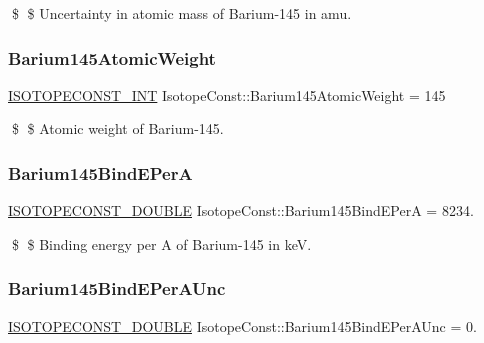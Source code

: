 \$ \$ Uncertainty in atomic mass of Barium-\/145 in amu. \mbox{\label{group___isotope_const-_barium-_ba145_gaafb854c4785f3573dd1d7de93b1d2133}} 
\subsubsection{\texorpdfstring{Barium145\+Atomic\+Weight}{Barium145AtomicWeight}}
{\footnotesize\ttfamily \mbox{\hyperlink{group___isotope_const-_macros_ga5f18360b3e99483a35c32d789e62621c}{I\+S\+O\+T\+O\+P\+E\+C\+O\+N\+S\+T\+\_\+\+I\+NT}} Isotope\+Const\+::\+Barium145\+Atomic\+Weight = 145}

\$ \$ Atomic weight of Barium-\/145. \mbox{\label{group___isotope_const-_barium-_ba145_gaf54d5fc5efbc4165699f50dfb455eccd}} 
\subsubsection{\texorpdfstring{Barium145\+Bind\+E\+PerA}{Barium145BindEPerA}}
{\footnotesize\ttfamily \mbox{\hyperlink{group___isotope_const-_macros_ga8f45a7272ce02c0b4c65c44636ed719a}{I\+S\+O\+T\+O\+P\+E\+C\+O\+N\+S\+T\+\_\+\+D\+O\+U\+B\+LE}} Isotope\+Const\+::\+Barium145\+Bind\+E\+PerA = 8234.}

\$ \$ Binding energy per A of Barium-\/145 in keV. \mbox{\label{group___isotope_const-_barium-_ba145_ga4ee25c484fc75a410197cdf67eb96844}} 
\subsubsection{\texorpdfstring{Barium145\+Bind\+E\+Per\+A\+Unc}{Barium145BindEPerAUnc}}
{\footnotesize\ttfamily \mbox{\hyperlink{group___isotope_const-_macros_ga8f45a7272ce02c0b4c65c44636ed719a}{I\+S\+O\+T\+O\+P\+E\+C\+O\+N\+S\+T\+\_\+\+D\+O\+U\+B\+LE}} Isotope\+Const\+::\+Barium145\+Bind\+E\+Per\+A\+Unc = 0.}

